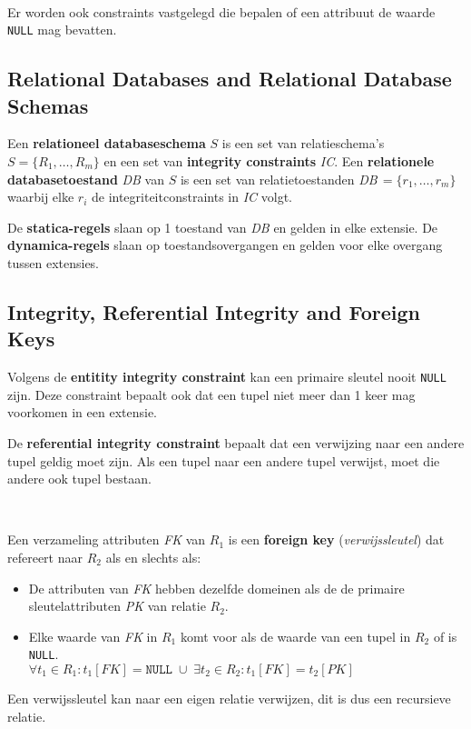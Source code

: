 ~

\noindent Er worden ook constraints vastgelegd die bepalen of een attribuut de waarde \texttt{NULL} mag bevatten.

\subsection{Relational Databases and Relational Database Schemas}
Een \textbf{relationeel databaseschema} $S$ is een set van relatieschema's $S = \{R_1, \dots, R_m\}$ en een set van \textbf{integrity constraints} \textit{IC}. Een \textbf{relationele databasetoestand} \textit{DB} van $S$ is een set van relatietoestanden \textit{DB}$\,= \{r_1, \dots, r_m\}$ waarbij elke $r_i$ de integriteitconstraints in \textit{IC} volgt.

De \textbf{statica-regels} slaan op 1 toestand van \textit{DB} en gelden in elke extensie. De \textbf{dynamica-regels} slaan op toestandsovergangen en gelden voor elke overgang tussen extensies.

\subsection{Integrity, Referential Integrity and Foreign Keys}
Volgens de \textbf{entitity integrity constraint} kan een primaire sleutel nooit \texttt{NULL} zijn. Deze constraint bepaalt ook dat een tupel niet meer dan 1 keer mag voorkomen in een extensie.

De \textbf{referential integrity constraint} bepaalt dat een verwijzing naar een andere tupel geldig moet zijn. Als een tupel naar een andere tupel verwijst, moet die andere ook tupel bestaan.

~

\noindent Een verzameling attributen \textit{FK} van $R_1$ is een \textbf{foreign key} (\textit{verwijssleutel}) dat refereert naar $R_2$ als en slechts als:
\begin{itemize}
	\item De attributen van \textit{FK} hebben dezelfde domeinen als de de primaire sleutelattributen \textit{PK} van relatie $R_2$.
	\item Elke waarde van \textit{FK} in $R_1$ komt voor als de waarde van een tupel in $R_2$ of is \texttt{NULL}.\\
	$\forall t_1 \in R_1 : t_1[\mathit{FK}] = \mathtt{NULL} \; \cup \; \exists t_2 \in R_2 :  t_1[\mathit{FK}] = t_2[\mathit{PK}]$
\end{itemize}

\noindent Een verwijssleutel kan naar een eigen relatie verwijzen, dit is dus een recursieve relatie.

